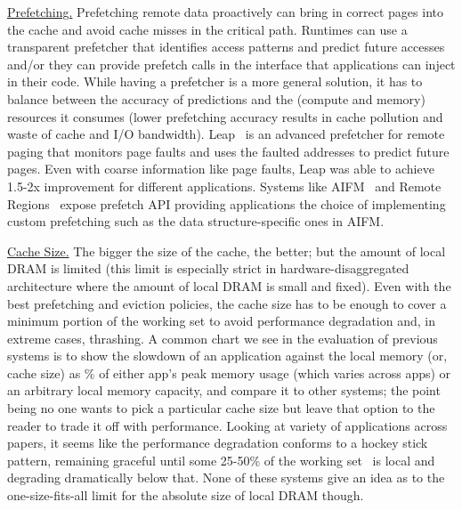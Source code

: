\vspace{3pt}
\noindent \uline{Prefetching.}
Prefetching remote data proactively can bring in 
correct pages into the cache and avoid cache misses 
in the critical path. Runtimes can use a transparent 
prefetcher that identifies access patterns and predict 
future accesses and/or they can provide prefetch calls 
in the interface that applications can inject in their 
code. While having a prefetcher is a more general 
solution, it has to balance between the accuracy of 
predictions and the (compute and memory) resources
it consumes (lower prefetching accuracy results in 
cache pollution and waste of cache and I/O bandwidth).
Leap~\cite{leap} is an advanced prefetcher for remote 
paging that monitors page faults and uses the faulted 
addresses to predict future pages. Even with coarse 
information like page faults, Leap was able to achieve 
1.5-2x improvement for different applications. 
Systems like AIFM~\cite{aifm} and Remote 
Regions~\cite{remregions} expose prefetch API 
providing applications the choice of implementing custom
prefetching such as the data structure-specific ones in AIFM. 

\vspace{3pt}
\noindent \uline{Cache Size.}
The bigger the size of the cache, the better; but the 
amount of local DRAM is limited (this limit is 
especially strict in hardware-disaggregated architecture 
where the amount of local DRAM is small and fixed). 
Even with the best prefetching and eviction policies, 
the cache size has to be enough to cover a minimum portion 
of the working set to avoid performance degradation and, 
in extreme cases, thrashing. A common chart we see in the 
evaluation of previous systems is to show the slowdown of 
an application against the local memory (or, cache size) as 
\% of either app's peak memory usage (which varies across 
apps) or an arbitrary local memory capacity, and compare 
it to other systems; the point being no one wants to pick 
a particular cache size but leave that option to the reader 
to trade it off with performance. Looking at variety of 
applications across papers, it seems like the performance 
degradation conforms to a hockey stick pattern, remaining 
graceful until some 25-50\% of the working 
set~\cite{netdisagg,kona,legoos} is local and degrading 
dramatically below that. None of these systems give 
an idea as to the one-size-fits-all limit for the absolute 
size of local DRAM though. 


